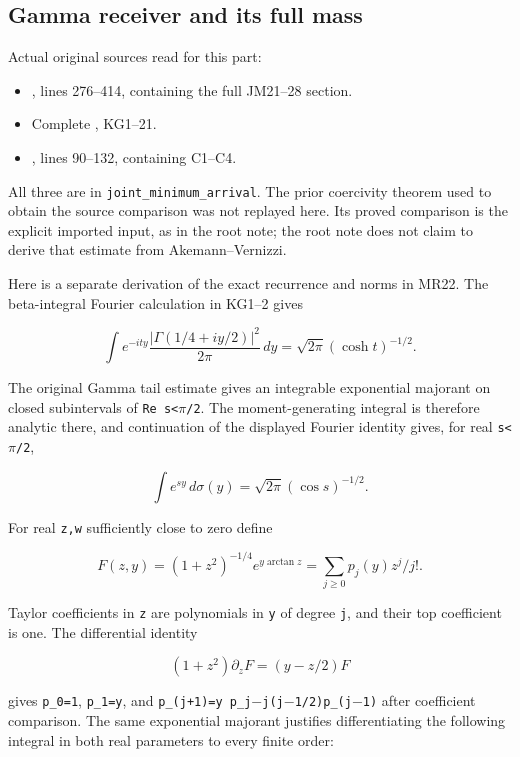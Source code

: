 \documentclass[11pt]{article}
\begin{document}
\subsection{Gamma receiver and its full mass}\label{mrreview:gamma-receiver-and-its-full-mass}

Actual original sources read for this part:

\begin{itemize}
\mrreviewtightlist
\item
  , lines 276--414, containing the full JM21--28 section.
\item
  Complete , KG1--21.
\item
  , lines 90--132, containing C1--C4.
\end{itemize}

All three are in \texttt{joint\_minimum\_arrival}. The prior coercivity theorem used to obtain the source comparison was not replayed here. Its proved comparison is the explicit imported input, as in the root note; the root note does not claim to derive that estimate from Akemann--Vernizzi.

Here is a separate derivation of the exact recurrence and norms in MR22. The beta-integral Fourier calculation in KG1--2 gives

\[
\int e^{-ity}\frac{|\Gamma(1/4+iy/2)|^2}{2\pi}\,dy
=\sqrt{2\pi}(\cosh t)^{-1/2}.
\]

The original Gamma tail estimate gives an integrable exponential majorant on closed subintervals of \texttt{\textbar{}Re\ s\textbar{}\textless{}\ensuremath{\pi}/2}. The moment-generating integral is therefore analytic there, and continuation of the displayed Fourier identity gives, for real \texttt{\textbar{}s\textbar{}\textless{}\ensuremath{\pi}/2},

\[
\int e^{sy}\,d\sigma(y)=\sqrt{2\pi}(\cos s)^{-1/2}.
\]

For real \texttt{z,w} sufficiently close to zero define

\[
F(z,y)=(1+z^2)^{-1/4}e^{y\arctan z}
=\sum_{j\ge0}p_j(y)z^j/j!.
\]

Taylor coefficients in \texttt{z} are polynomials in \texttt{y} of degree \texttt{j}, and their top coefficient is one. The differential identity

\[
(1+z^2)\partial_z F=(y-z/2)F
\]

gives \texttt{p\_0=1}, \texttt{p\_1=y}, and \texttt{p\_(j+1)=y\ p\_j\ensuremath{-}j(j\ensuremath{-}1/2)p\_(j\ensuremath{-}1)} after coefficient comparison. The same exponential majorant justifies differentiating the following integral in both real parameters to every finite order:
\end{document}
